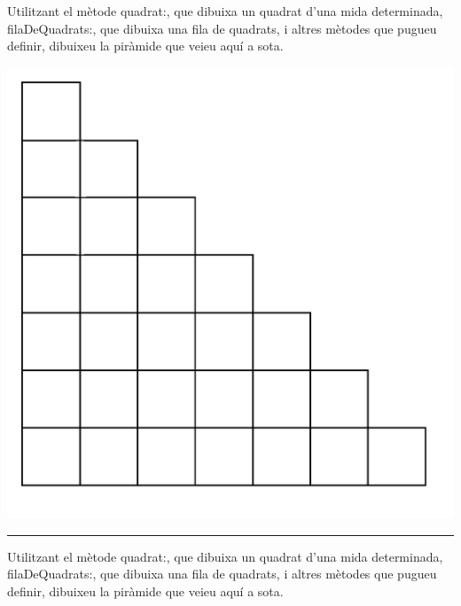 \begin{center}
\colorbox{black}{}
\end{center}
{\small
\noindent
Utilitzant el mètode \textsf{quadrat:}, que dibuixa un quadrat d'una mida determinada, \textsf{filaDeQuadrats:}, que dibuixa una fila de quadrats, i altres mètodes que pugueu definir, dibuixeu la piràmide que veieu aquí a sota.}
\begin{center}
\includegraphics[scale=0.5]{Imatges/figuraE16-11.png} 
\end{center}
\noindent
\rule{\textwidth}{3pt}
\newpage
\begin{center}
\colorbox{black}{}
\end{center}
{\small
\noindent
Utilitzant el mètode \textsf{quadrat:}, que dibuixa un quadrat d'una mida determinada, \textsf{filaDeQuadrats:}, que dibuixa una fila de quadrats, i altres mètodes que pugueu definir, dibuixeu la piràmide que veieu aquí a sota.}
